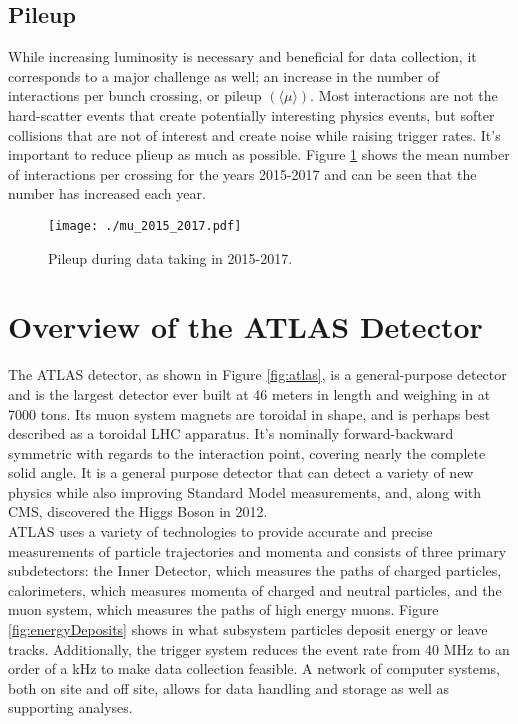 
\subsection{Pileup}

While increasing luminosity is necessary and beneficial for data collection, it corresponds to a major challenge as well; an increase in the number of interactions per bunch crossing, or pileup $(\langle \mu \rangle)$.  Most interactions are not the hard-scatter events that create potentially interesting physics events, but softer collisions that are not of interest and create noise while raising trigger rates.  It's important to reduce plieup as much as possible. Figure \ref{fig:mu} shows the mean number of interactions per crossing for the years 2015-2017 and can be seen that the number has increased each year. \\%

\begin{figure}[h!]
  \centering
	\texttt{[image: ./mu\_2015\_2017.pdf]}
\caption{\label{fig:mu}{ Pileup during data taking in 2015-2017. }} %
\end{figure}

\section{Overview of the ATLAS Detector}
The ATLAS detector, as shown in Figure \ref{fig:atlas}, is a general-purpose detector and is the largest detector ever built at 46 meters in length and weighing in at 7000 tons.  Its muon system magnets are toroidal in shape, and is perhaps best described as a toroidal LHC apparatus.  It's nominally forward-backward symmetric with regards to the interaction point, covering nearly the complete solid angle.  It is a general purpose detector that can detect a variety of new physics while also improving Standard Model measurements, and, along with CMS, discovered the Higgs Boson in 2012.  \\

ATLAS uses a variety of technologies to provide accurate and precise measurements of particle trajectories and momenta and consists of three primary subdetectors: the Inner Detector, which measures the paths of charged particles, calorimeters, which measures momenta of charged and neutral particles, and the muon system, which measures the paths of high energy muons.   Figure \ref{fig:energyDeposits} shows in what subsystem particles deposit energy or leave tracks.  Additionally, the trigger system reduces the event rate from 40 MHz to an order of a kHz to make data collection feasible.  A network of computer systems, both on site and off site, allows for data handling and storage as well as supporting analyses.\\

